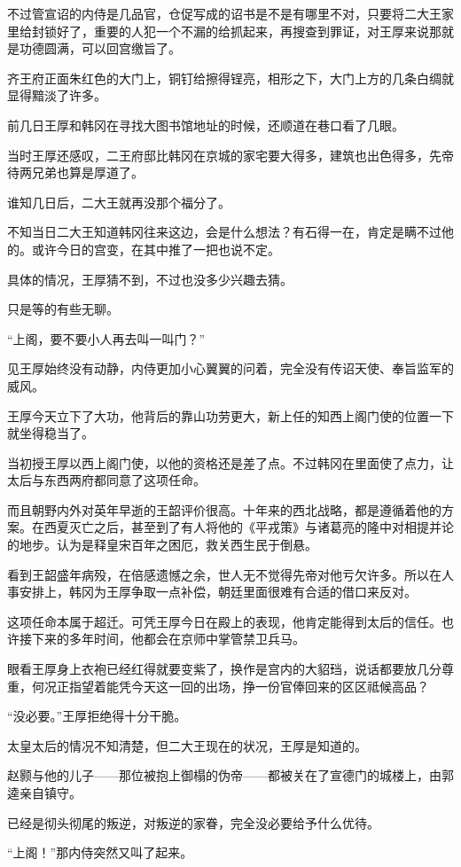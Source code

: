不过管宣诏的内侍是几品官，仓促写成的诏书是不是有哪里不对，只要将二大王家里给封锁好了，重要的人犯一个不漏的给抓起来，再搜查到罪证，对王厚来说那就是功德圆满，可以回宫缴旨了。

齐王府正面朱红色的大门上，铜钉给擦得锃亮，相形之下，大门上方的几条白绸就显得黯淡了许多。

前几日王厚和韩冈在寻找大图书馆地址的时候，还顺道在巷口看了几眼。

当时王厚还感叹，二王府邸比韩冈在京城的家宅要大得多，建筑也出色得多，先帝待两兄弟也算是厚道了。

谁知几日后，二大王就再没那个福分了。

不知当日二大王知道韩冈往来这边，会是什么想法？有石得一在，肯定是瞒不过他的。或许今日的宫变，在其中推了一把也说不定。

具体的情况，王厚猜不到，不过也没多少兴趣去猜。

只是等的有些无聊。

“上阁，要不要小人再去叫一叫门？”

见王厚始终没有动静，内侍更加小心翼翼的问着，完全没有传诏天使、奉旨监军的威风。

王厚今天立下了大功，他背后的靠山功劳更大，新上任的知西上阁门使的位置一下就坐得稳当了。

当初授王厚以西上阁门使，以他的资格还是差了点。不过韩冈在里面使了点力，让太后与东西两府都同意了这项任命。

而且朝野内外对英年早逝的王韶评价很高。十年来的西北战略，都是遵循着他的方案。在西夏灭亡之后，甚至到了有人将他的《平戎策》与诸葛亮的隆中对相提并论的地步。认为是释皇宋百年之困厄，救关西生民于倒悬。

看到王韶盛年病殁，在倍感遗憾之余，世人无不觉得先帝对他亏欠许多。所以在人事安排上，韩冈为王厚争取一点补偿，朝廷里面很难有合适的借口来反对。

这项任命本属于超迁。可凭王厚今日在殿上的表现，他肯定能得到太后的信任。也许接下来的多年时间，他都会在京师中掌管禁卫兵马。

眼看王厚身上衣袍已经红得就要变紫了，换作是宫内的大貂珰，说话都要放几分尊重，何况正指望着能凭今天这一回的出场，挣一份官俸回来的区区祗候高品？

“没必要。”王厚拒绝得十分干脆。

太皇太后的情况不知清楚，但二大王现在的状况，王厚是知道的。

赵颢与他的儿子——那位被抱上御榻的伪帝——都被关在了宣德门的城楼上，由郭逵亲自镇守。

已经是彻头彻尾的叛逆，对叛逆的家眷，完全没必要给予什么优待。

“上阁！”那内侍突然又叫了起来。

